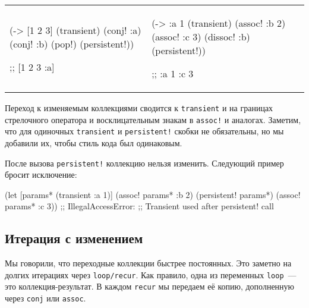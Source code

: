 \else

\begin{english}

\noindent
\begin{tabular}{ @{}p{5cm} @{}p{5cm} }

  \begin{clojure}
(-> [1 2 3]
    (transient)
    (conj! :a)
    (conj! :b)
    (pop!)
    (persistent!))

;; [1 2 3 :a]
  \end{clojure}

&

  \begin{clojure}
(-> {:a 1}
    (transient)
    (assoc! :b 2)
    (assoc! :c 3)
    (dissoc! :b)
    (persistent!))

;; {:a 1 :c 3}
  \end{clojure}

\end{tabular}

\end{english}

\fi

Переход к изменяемым коллекциями сводится к \verb|transient| и
 на границах стрелочного оператора и восклицательным знакам в
\verb|assoc!| и аналогах. Заметим, что для одиночных \verb|transient| и
\verb|persistent!| скобки не обязательны, но мы добавили их, чтобы стиль кода
был одинаковым.

После вызова \verb|persistent!| коллекцию нельзя изменить. Следующий пример
бросит исключение:

\begin{english}
  \begin{clojure}
(let [params* (transient {:a 1})]
  (assoc! params* :b 2)
  (persistent! params*)
  (assoc! params* :c 3))
;; IllegalAccessError:
;; Transient used after persistent! call
  \end{clojure}
\end{english}

\subsection{Итерация с изменением}


Мы говорили, что переходные коллекции быстрее постоянных. Это заметно на долгих
итерациях через \verb|loop/recur|. Как правило, одна из переменных
\verb|loop|~--- это коллекция-результат. В каждом \verb|recur| мы передаем её
копию, дополненную через \verb|conj| или \verb|assoc|.


